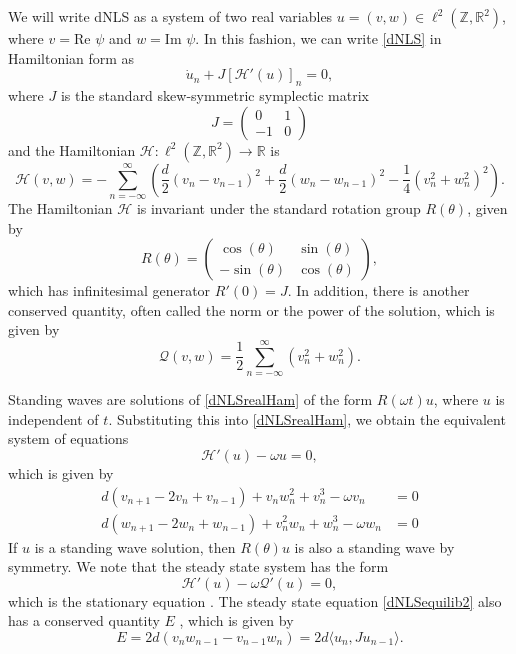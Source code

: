 \documentclass[12pt]{article}
\def\R{{\mathbb R}}
\def\Z{{\mathbb Z}}
\begin{document}
We will write dNLS as a system of two real variables $u = (v, w) \in \ell^2(\Z, \R^2)$, where $v = \text{Re }\psi$ and $w = \text{Im }\psi$. In this fashion, we can write \eqref{dNLS} in Hamiltonian form as
\begin{equation}\label{dNLSrealHam}
\dot{u}_n + J [\mathcal{H}'(u)]_n = 0,
\end{equation}
where $J$ is the standard skew-symmetric symplectic matrix
\[
J = \begin{pmatrix}0 & 1 \\ -1 & 0\end{pmatrix}
\]
and the Hamiltonian $\mathcal{H}: \ell^2(\Z,\R^2) \rightarrow \R$ is
\begin{equation}\label{dNLSrealH}
\mathcal{H}(v, w) = -\sum_{n = -\infty}^\infty 
\left( \frac{d}{2}\left(v_n - v_{n-1}\right)^2 + \frac{d}{2}\left(w_n - w_{n-1}\right)^2 - \frac{1}{4}\left( v_n^2 + w_n^2 \right)^2 \right).
\end{equation}
The Hamiltonian $\mathcal{H}$ is invariant under the standard rotation group $R(\theta)$, given by
\begin{equation}\label{Rtheta}
R(\theta) = \begin{pmatrix}
\cos(\theta) & \sin(\theta) \\
-\sin(\theta)& \cos(\theta)
\end{pmatrix},
\end{equation}
which has infinitesimal generator $R'(0) = J$. In addition, there is another conserved quantity, often called the norm or the power of the solution, which is given by
\begin{equation}\label{dNLSQ}
\mathcal{Q}(v, w) = \frac{1}{2} \sum_{n = -\infty}^\infty 
\left( v_n^2 + w_n ^2\right).
\end{equation}

Standing waves are solutions of \eqref{dNLSrealHam} of the form $R(\omega t) u$, where $u$ is independent of $t$. Substituting this into \eqref{dNLSrealHam}, we obtain the equivalent system of equations
\begin{equation}\label{dNLSequilib1}
\mathcal{H}'(u) - \omega u = 0,
\end{equation}
which is given by
\begin{equation}\label{dNLSequilib2}
\begin{aligned}
d (v_{n+1} - 2 v_n + v_{n-1}) + v_n w_n^2 + v_n^3 - \omega v_n &= 0 \\
d (w_{n+1} - 2 w_n + w_{n-1}) + v_n^2 w_n + w_n^3 - \omega w_n &= 0
\end{aligned}
\end{equation}
If $u$ is a standing wave solution, then $R(\theta) u$ is also a standing wave by symmetry. We note that the steady state system has the form
\begin{equation}
\mathcal{H}'(u) - \omega \mathcal{Q}'(u) = 0,
\end{equation}
which is the stationary equation \cite[(2.15)]{Grillakis1987}. The steady state equation \eqref{dNLSequilib2} also has a conserved quantity $E$ \cite{Johansson2000}, which is given by
\begin{equation}\label{dNLSE}
E = 2d(v_n w_{n-1} - v_{n-1} w_n) = 2d \langle u_n, J u_{n-1} \rangle.
\end{equation}
\end{document}

